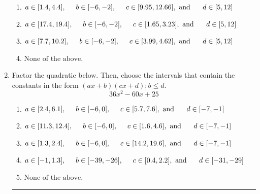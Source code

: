 \documentclass[14pt]{extbook}
\newcommand{\litem}[1]{\item#1\hspace*{-1cm}\rule{\textwidth}{0.4pt}}
\begin{document}
\begin{enumerate}
{\begin{enumerate}[label=\Alph*.]
\item \( a \in [1.4, 4.4], \hspace*{5mm} b \in [-6, -2], \hspace*{5mm} c \in [9.95, 12.66], \text{ and } \hspace*{5mm} d \in [5, 12] \)
\item \( a \in [17.4, 19.4], \hspace*{5mm} b \in [-6, -2], \hspace*{5mm} c \in [1.65, 3.23], \text{ and } \hspace*{5mm} d \in [5, 12] \)
\item \( a \in [7.7, 10.2], \hspace*{5mm} b \in [-6, -2], \hspace*{5mm} c \in [3.99, 4.62], \text{ and } \hspace*{5mm} d \in [5, 12] \)
\item \( \text{None of the above.} \)

\end{enumerate} }
\litem{
Factor the quadratic below. Then, choose the intervals that contain the constants in the form $(ax+b)(cx+d); b \leq d.$\[ 36x^{2} -60 x + 25 \]\begin{enumerate}[label=\Alph*.]
\item \( a \in [2.4, 6.1], \hspace*{5mm} b \in [-6, 0], \hspace*{5mm} c \in [5.7, 7.6], \text{ and } \hspace*{5mm} d \in [-7, -1] \)
\item \( a \in [11.3, 12.4], \hspace*{5mm} b \in [-6, 0], \hspace*{5mm} c \in [1.6, 4.6], \text{ and } \hspace*{5mm} d \in [-7, -1] \)
\item \( a \in [1.3, 2.4], \hspace*{5mm} b \in [-6, 0], \hspace*{5mm} c \in [14.2, 19.6], \text{ and } \hspace*{5mm} d \in [-7, -1] \)
\item \( a \in [-1, 1.3], \hspace*{5mm} b \in [-39, -26], \hspace*{5mm} c \in [0.4, 2.2], \text{ and } \hspace*{5mm} d \in [-31, -29] \)
\item \( \text{None of the above.} \)


\end{enumerate}}
\end{enumerate}
\end{document}
